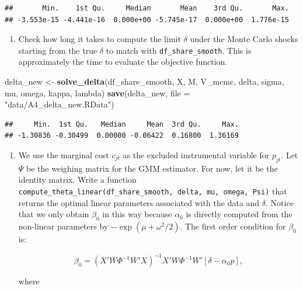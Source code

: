 \documentclass[]{book}
\newenvironment{Shaded}{\begin{snugshade}}{\end{snugshade}}
\newcommand{\KeywordTok}[1]{\textcolor[rgb]{0.13,0.29,0.53}{\textbf{#1}}}
\newcommand{\DataTypeTok}[1]{\textcolor[rgb]{0.13,0.29,0.53}{#1}}
\newcommand{\StringTok}[1]{\textcolor[rgb]{0.31,0.60,0.02}{#1}}
\newcommand{\OperatorTok}[1]{\textcolor[rgb]{0.81,0.36,0.00}{\textbf{#1}}}
\newcommand{\NormalTok}[1]{#1}
\providecommand{\tightlist}{%
  \setlength{\itemsep}{0pt}\setlength{\parskip}{0pt}}
\begin{document}
\begin{verbatim}
##       Min.    1st Qu.     Median       Mean    3rd Qu.       Max. 
## -3.553e-15 -4.441e-16  0.000e+00 -5.745e-17  0.000e+00  1.776e-15
\end{verbatim}

\begin{enumerate}
\def\labelenumi{\arabic{enumi}.}
\setcounter{enumi}{8}
\tightlist
\item
  Check how long it takes to compute the limit \(\delta\) under the
  Monte Carlo shocks starting from the true \(\delta\) to match with
  \texttt{df\_share\_smooth}. This is approximately the time to evaluate
  the objective function.
\end{enumerate}

\begin{Shaded}
\begin{Highlighting}[]
\NormalTok{delta_new <-}
\StringTok{  }\KeywordTok{solve_delta}\NormalTok{(df_share_smooth, X, M, V_mcmc, delta, sigma, mu, omega, kappa, lambda)}
\KeywordTok{save}\NormalTok{(delta_new, }\DataTypeTok{file =} \StringTok{"data/A4_delta_new.RData"}\NormalTok{)}
\end{Highlighting}
\end{Shaded}

\begin{Shaded}
\end{Shaded}

\begin{verbatim}
##     Min.  1st Qu.   Median     Mean  3rd Qu.     Max. 
## -1.30836 -0.30499  0.00000 -0.06422  0.16800  1.36169
\end{verbatim}

\begin{enumerate}
\def\labelenumi{\arabic{enumi}.}
\setcounter{enumi}{9}
\tightlist
\item
  We use the marginal cost \(c_{jt}\) as the excluded instrumental
  variable for \(p_{jt}\). Let \(\Psi\) be the weighing matrix for the
  GMM estimator. For now, let it be the identity matrix. Write a
  function
  \texttt{compute\_theta\_linear(df\_share\_smooth,\ delta,\ mu,\ omega,\ Psi)}
  that returns the optimal linear parameters associated with the data
  and \(\delta\). Notice that we only obtain \(\beta_0\) in this way
  because \(\alpha_0\) is directly computed from the non-linear
  parameters by \(-\exp(\mu + \omega^2/2)\). The first order condition
  for \(\beta_0\) is:

  \begin{equation}
  \beta_0 = (X'W \Phi^{-1} W'X)^{-1} X' W \Phi^{-1} W' [\delta - \alpha_0 p],
  \end{equation}

  where
\end{enumerate}
\end{document}
